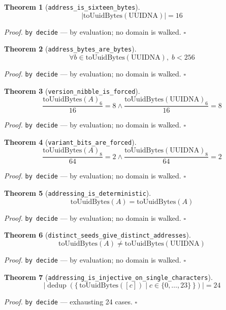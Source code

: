 \documentclass[11pt]{article}
\newtheorem{theorem}{Theorem}[section]
\begin{document}
\begin{theorem}[\texttt{address\_is\_sixteen\_bytes}]
\[ \left|\mathrm{toUuidBytes}\mathopen{}\left(\mathrm{UUIDNA}\right)\right| = 16 \]
\end{theorem}
\noindent\emph{Proof.} \texttt{by decide} --- by evaluation; no domain is walked. \hfill$\square$

\begin{theorem}[\texttt{address\_bytes\_are\_bytes}]
\[ \forall b \in \mathrm{toUuidBytes}\mathopen{}\left(\mathrm{UUIDNA}\right),\; b < 256 \]
\end{theorem}
\noindent\emph{Proof.} \texttt{by decide} --- by evaluation; no domain is walked. \hfill$\square$

\begin{theorem}[\texttt{version\_nibble\_is\_forced}]
\[ \frac{\mathrm{toUuidBytes}\mathopen{}\left(A\right)_{6}}{16} = 8 \land \frac{\mathrm{toUuidBytes}\mathopen{}\left(\mathrm{UUIDNA}\right)_{6}}{16} = 8 \]
\end{theorem}
\noindent\emph{Proof.} \texttt{by decide} --- by evaluation; no domain is walked. \hfill$\square$

\begin{theorem}[\texttt{variant\_bits\_are\_forced}]
\[ \frac{\mathrm{toUuidBytes}\mathopen{}\left(A\right)_{8}}{64} = 2 \land \frac{\mathrm{toUuidBytes}\mathopen{}\left(\mathrm{UUIDNA}\right)_{8}}{64} = 2 \]
\end{theorem}
\noindent\emph{Proof.} \texttt{by decide} --- by evaluation; no domain is walked. \hfill$\square$

\begin{theorem}[\texttt{addressing\_is\_deterministic}]
\[ \mathrm{toUuidBytes}\mathopen{}\left(A\right) = \mathrm{toUuidBytes}\mathopen{}\left(A\right) \]
\end{theorem}
\noindent\emph{Proof.} \texttt{by decide} --- by evaluation; no domain is walked. \hfill$\square$

\begin{theorem}[\texttt{distinct\_seeds\_give\_distinct\_addresses}]
\[ \mathrm{toUuidBytes}\mathopen{}\left(A\right) \neq \mathrm{toUuidBytes}\mathopen{}\left(\mathrm{UUIDNA}\right) \]
\end{theorem}
\noindent\emph{Proof.} \texttt{by decide} --- by evaluation; no domain is walked. \hfill$\square$

\begin{theorem}[\texttt{addressing\_is\_injective\_on\_single\_characters}]
\[ \left|\operatorname{dedup}\left(\{\, \mathrm{toUuidBytes}\mathopen{}\left([c]\right) \mid c \in \{0,\dots,23\} \,\}\right)\right| = 24 \]
\end{theorem}
\noindent\emph{Proof.} \texttt{by decide} --- exhausting 24 cases. \hfill$\square$
\end{document}

